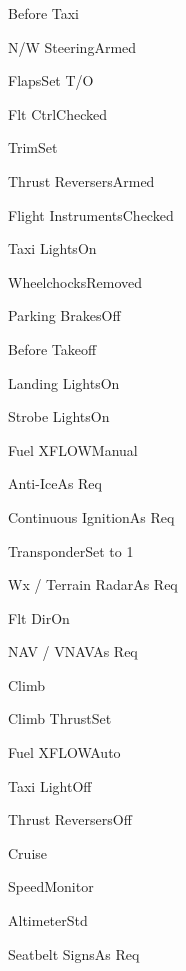 \documentclass[sim-use]{checklist}
\begin{document}
\begin{checklist}{Before Taxi}
    \item{N/W Steering}{Armed}
    \item{Flaps}{Set T/O}
    \item{Flt Ctrl}{Checked}
    \item{Trim}{Set}
    \item{Thrust Reversers}{Armed}
    \item{Flight Instruments}{Checked}
    \item{Taxi Lights}{On}
    \item{Wheelchocks}{Removed}
    \item{Parking Brakes}{Off}
\end{checklist}

\begin{checklist}{Before Takeoff}
    \item{Landing Lights}{On}
    \item{Strobe Lights}{On}
    \item{Fuel XFLOW}{Manual}
    \item{Anti-Ice}{As Req}
    \item{Continuous Ignition}{As Req}
    \item{Transponder}{Set to 1}
    \item{Wx / Terrain Radar}{As Req}
    \item{Flt Dir}{On}
    \item{NAV / VNAV}{As Req}
\end{checklist}

\begin{checklist}{Climb}
    \item{Climb Thrust}{Set}
    \item{Fuel XFLOW}{Auto}
    \item{Taxi Light}{Off}
    \item{Thrust Reversers}{Off}
\end{checklist}

\begin{checklist}{Cruise}
    \item{Speed}{Monitor}
    \item{Altimeter}{Std}
    \item{Seatbelt Signs}{As Req}
\end{checklist}  
\end{document}
